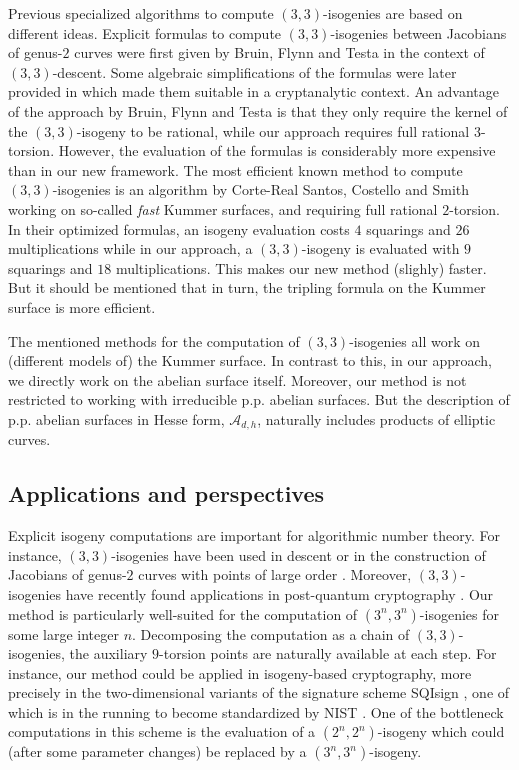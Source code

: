 \documentclass[11pt]{amsart}
\theoremstyle{definition}
\newcommand{\A}{\mathcal{A}}
\begin{document}
Previous specialized algorithms to compute $(3,3)$-isogenies are based on different ideas. Explicit formulas to compute $(3,3)$-isogenies between Jacobians of genus-$2$ curves were first given by Bruin, Flynn and Testa \cite{3descent} in the context of $(3,3)$-descent. Some algebraic simplifications of the formulas were later provided in \cite{decru2023efficient} which made them suitable in a cryptanalytic context. An advantage of the approach by Bruin, Flynn and Testa is that they only require the kernel of the $(3,3)$-isogeny to be rational, while  our approach requires full rational $3$-torsion. However, the evaluation of the formulas is considerably more expensive than in our new framework.
The most efficient known method to compute $(3,3)$-isogenies is an algorithm by Corte-Real Santos, Costello and Smith \cite{corte2025efficient} working on so-called {\em fast} Kummer surfaces, and requiring full rational $2$-torsion. In their optimized formulas, an isogeny evaluation costs $4$ squarings and $26$ multiplications while in our approach, a $(3,3)$-isogeny is evaluated with $9$ squarings and $18$ multiplications. This makes our new method (slighly) faster. But it should be mentioned that in turn, the tripling formula on the Kummer surface is more efficient.

The mentioned methods for the computation of $(3,3)$-isogenies all work on (different models of) the Kummer surface. In contrast to this, in our approach, we directly work on the abelian surface itself. Moreover, our method is not restricted to working with irreducible p.p. abelian surfaces. But the description of p.p. abelian surfaces in Hesse form, $\A_{d,h}$, naturally includes products of elliptic curves.



\subsection{Applications and perspectives}

Explicit isogeny computations are important for algorithmic number theory. For instance, $(3,3)$-isogenies have been used in descent \cite{3descent} or in the construction of Jacobians of genus-$2$ curves with points of large order \cite{howe-point-counting}.  Moreover, $(3,3)$-isogenies have recently found applications in post-quantum cryptography \cite{SIDH-attack}. Our method is particularly well-suited for the computation of $(3^n,3^n)$-isogenies for some large integer $n$. Decomposing the computation as a chain of $(3,3)$-isogenies, the auxiliary $9$-torsion points are naturally available at each step. For instance, our method could be applied in isogeny-based cryptography, more precisely in the two-dimensional variants of the signature scheme SQIsign \cite{SQIPrime,SQISign2D-West,SQISign2D-East}, one of which is in the running to become standardized by NIST \cite{sqisign}. One of the bottleneck computations in this scheme is the evaluation of a $(2^n,2^n)$-isogeny which could (after some parameter changes) be replaced by a $(3^n,3^n)$-isogeny. %
\end{document}
